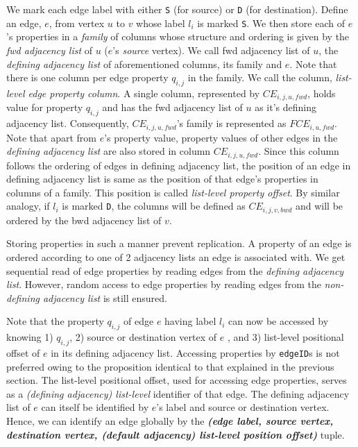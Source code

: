 We mark each edge label with either \texttt{S} (for source) or \texttt{D} (for destination). Define an edge, $e$, from vertex $u$ to $v$ whose label $l_i$ is marked \texttt{S}. We then store each of $e$'s properties in a \emph{family} of columns whose structure and ordering is given by the \emph{\gls{fwd} adjacency list} of $u$ ($e$'s \emph{source} vertex). We call \gls{fwd} adjacency list of $u$, the \emph{defining adjacency list} of aforementioned columns, its family and $e$. Note that there is one column per edge property $q_{i,j}$ in the family. We call the column, \emph{list-level edge property column}. A single column, represented by $CE_{i,j,u,fwd}$, holds value for property $q_{i,j}$ and has the \gls{fwd} adjacency list of $u$ as it's defining adjacency list. Consequently, $CE_{i,j,u,fwd}$'s family is represented as $FCE_{i,u,fwd}$. Note that apart from $e$'s property value, property values of other edges in the \emph{defining adjacency list} are also stored in column $CE_{i,j,u,fwd}$. Since this column follows the ordering of edges in defining adjacency list, the position of an edge in defining adjacency list is same as the position of that edge's properties in columns of a family. This position is called \emph{list-level property offset}. By similar analogy, if $l_i$ is marked \texttt{D}, the columns will be defined as $CE_{i,j,v,bwd}$ and will be ordered by the \gls{bwd} adjacency list of $v$.

Storing properties in such a manner prevent replication. A property of an edge is ordered according to one of 2 adjacency lists an edge is associated with. We get sequential read of edge properties by reading edges from the \emph{defining adjacency list}. However, random access to edge properties by reading edges from the \emph{non-defining adjacency list} is still ensured.

Note that the property $q_{i,j}$ of edge $e$ having label $l_i$ can now be accessed by knowing 1) $q_{i,j}$, 2) source or destination vertex of $e$ , and 3) list-level positional offset of $e$ in its defining adjacency list. Accessing properties by \texttt{edgeID}s is not preferred owing to the proposition identical to that explained in the previous section. The list-level positional offset, used for accessing edge properties, serves as a \emph{(defining adjacency) list-level} identifier of that edge. The defining adjacency list of $e$ can itself be identified by $e$'s label and source or destination vertex. Hence, we can identify an edge globally by the \emph{\textbf{(edge label, source vertex, destination vertex, (default adjacency) list-level position offset)}} tuple. 

